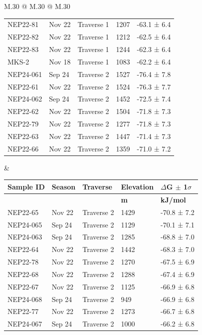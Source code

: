 \begin{landscape}
\begin{table}
\begin{tabular}{M{.30\textwidth} @{\hspace{4cm}} M{.30\textwidth} @{\hspace{4cm}} M{.30\textwidth}}
\begin{tabular}{l l l l l}
    NEP22-81 & Nov 22 & Traverse 1 & 1207 & -63.1 ±  6.4 \\
    NEP22-82 & Nov 22 & Traverse 1 & 1212 & -62.5 ±  6.4 \\
    NEP22-83 & Nov 22 & Traverse 1 & 1244 & -62.3 ±  6.4 \\
    MKS-2 & Nov 18 & Traverse 1 & 1083 & -62.2 ±  6.4 \\
    \specialrule{0.2pt}{1pt}{1pt}
    NEP24-061 & Sep 24 & Traverse 2 & 1527 & -76.4 ±  7.8 \\
    NEP22-61 & Nov 22 & Traverse 2 & 1524 & -76.3 ±  7.7 \\
    NEP24-062 & Sep 24 & Traverse 2 & 1452 & -72.5 ±  7.4 \\
    NEP22-62 & Nov 22 & Traverse 2 & 1504 & -71.8 ±  7.3 \\
    NEP22-79 & Nov 22 & Traverse 2 & 1277 & -71.8 ±  7.3 \\
    NEP22-63 & Nov 22 & Traverse 2 & 1447 & -71.4 ±  7.3 \\
    NEP22-66 & Nov 22 & Traverse 2 & 1359 & -71.0 ±  7.2 \\
    \hline
    \end{tabular}
    &
    \begin{tabular}{l l l l l}
        \setlength\tabcolsep{0.1cm}
\textbf{Sample ID}  &  \textbf{Season}  &  \textbf{Traverse}  &  \textbf{Elevation}  &  \textbf{$\Delta$G $\pm$ 1$\sigma$} \\
\hline
&   &   &  \textbf{m}  &  \textbf{kJ/mol} \\
\hline
    NEP22-65 & Nov 22 & Traverse 2 & 1429 & -70.8 ±  7.2 \\
    NEP24-065 & Sep 24 & Traverse 2 & 1129 & -70.1 ±  7.1 \\
    NEP24-063 & Sep 24 & Traverse 2 & 1285 & -68.8 ±  7.0 \\
    NEP22-64 & Nov 22 & Traverse 2 & 1442 & -68.3 ±  7.0 \\
    NEP22-78 & Nov 22 & Traverse 2 & 1270 & -67.5 ±  6.9 \\
    NEP22-68 & Nov 22 & Traverse 2 & 1288 & -67.4 ±  6.9 \\
    NEP22-67 & Nov 22 & Traverse 2 & 1125 & -66.9 ±  6.8 \\
    NEP24-068 & Sep 24 & Traverse 2 & 949 & -66.9 ±  6.8 \\
    NEP22-77 & Nov 22 & Traverse 2 & 1273 & -66.7 ±  6.8 \\
    NEP24-067 & Sep 24 & Traverse 2 & 1000 & -66.2 ±  6.8 \\

\end{tabular}
\end{tabular}
\end{table}
\end{landscape}
